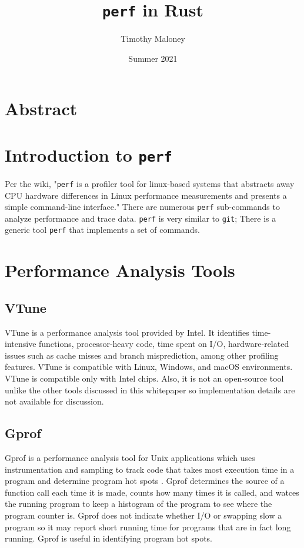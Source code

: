 \documentclass{article}
\title{\texttt{perf} in Rust}
\author{Timothy Maloney}
\date{Summer 2021}
\begin{document}
\maketitle
\section*{Abstract}
\pagebreak
\section{Introduction to \texttt{perf}}
Per the wiki, "\texttt{perf} is a profiler tool for linux-based systems that abstracts away CPU hardware differences in Linux performance measurements and presents a simple command-line interface." There are numerous \texttt{perf} sub-commands to analyze performance and trace data. \texttt{perf} is very similar to \texttt{git}; There is a generic tool \texttt{perf} that
implements a set of commands.
\section{Performance Analysis Tools}
\subsection{VTune}
VTune is a performance analysis tool provided by Intel. It identifies
time-intensive functions, processor-heavy code, time spent on I/O,
hardware-related issues such as cache misses and branch misprediction, among
other profiling features. VTune is compatible with Linux, Windows, and macOS
environments. VTune is compatible only with Intel chips. Also, it is not an
open-source tool unlike the other tools discussed in this whitepaper so
implementation details are not available for discussion.
\subsection{Gprof}
Gprof is a performance analysis tool for Unix applications which uses
instrumentation and sampling to track code that takes most execution time in a
program and determine program hot spots . Gprof determines the source of a
function call each time it is made, counts how many times it is called, and
watces the
running program to keep a histogram of the program to see where the program
counter is. Gprof does not indicate whether I/O or swapping slow a program so it
may report short running time for programs that are in fact long running. Gprof
is useful in identifying program hot spots.
\end{document}
